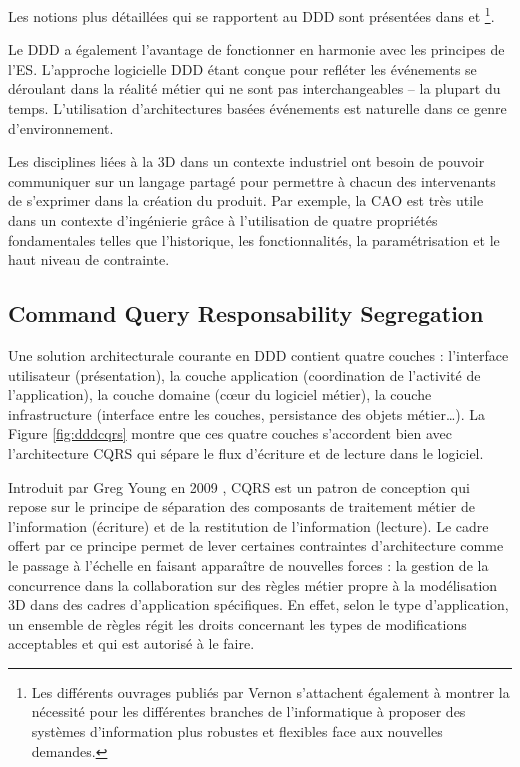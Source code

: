 Les notions plus détaillées qui se rapportent au \gls{DDD} sont présentées dans 
\cite{Evans2003} et \cite{Vernon2013}\footnote{Les différents ouvrages publiés par 
Vernon s'attachent également à montrer la nécessité pour les différentes 
branches de l'informatique à proposer des 
systèmes d'information plus robustes et flexibles face aux nouvelles demandes.}.

Le \gls{DDD} a également l'avantage de fonctionner en harmonie avec les 
principes de l'\gls{ES}. L'approche logicielle \gls{DDD} étant conçue pour refléter 
les événements se déroulant dans la réalité métier qui ne sont pas 
interchangeables -- la plupart du temps. L'utilisation d'architectures 
basées événements est naturelle dans ce genre d'environnement. 

Les disciplines liées à la \gls{3D} dans un contexte industriel ont besoin de pouvoir 
communiquer sur un langage partagé pour permettre à chacun des 
intervenants de s'exprimer dans la création du produit. Par exemple, la \gls{CAO} 
est très utile dans un contexte d'ingénierie grâce à l'utilisation de quatre propriétés 
fondamentales telles que l'historique, les fonctionnalités, la paramétrisation et le 
haut niveau de contrainte.



\subsection{Command Query Responsability Segregation}
\label{sec:CQRS}
Une solution architecturale courante en \gls{DDD} contient quatre 
couches : l'interface utilisateur (présentation), la couche application (coordination 
de l'activité de l'application), la couche domaine (c\oe ur du logiciel métier), la 
couche infrastructure (interface entre les couches, persistance des objets 
métier\dots). La Figure \ref{fig:dddcqrs} montre que ces quatre couches s'accordent
bien avec l'architecture \gls{CQRS} qui sépare le flux d'écriture et de lecture dans 
le logiciel.

Introduit par Greg Young en 2009 \cite{Young2009}, \gls{CQRS} est un patron de 
conception qui repose sur le principe de séparation des composants de traitement 
métier de l'information (écriture) et de la restitution de l'information (lecture). Le 
cadre offert par ce principe permet de lever certaines contraintes d'architecture 
comme le passage à l'échelle en faisant apparaître de nouvelles forces : la gestion 
de la concurrence dans la collaboration sur des règles métier propre à la 
modélisation \gls{3D} dans des cadres d'application spécifiques. En effet, selon le 
type 
d'application, un ensemble de règles régit les droits concernant les types de 
modifications acceptables et qui est autorisé à le faire.

